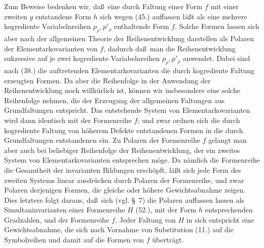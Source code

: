 Zum Beweise bedenken wir, da\ss\ eine durch Faltung einer Form $f$ mit einer zweiten $g$ entstandene Form $h$ sich wegen (45.) auffassen l\"a\ss t als eine mehrere kogrediente Variabelnreihen $p_\rho,p'_\rho$ enthaltende Form $f$. Solche Formen lassen sich aber nach der allgemeinen Theorie der Reihenentwicklung darstellen als Polaren der Elementarkovarianten von $f$, dadurch da\ss\ man die Reihenentwicklung sukzessive auf je zwei kogrediente Variabelnreihen $p_\rho,p'_\rho$ anwendet. Dabei sind nach (38.) die auftretenden Elementarkovarianten die durch kogrediente Faltung erzeugten Formen. Da aber die Reihenfolge in der Anwendung der Reihenentwicklung noch willk\"urlich ist, k\"onnen wir insbesondere eine solche Reihenfolge nehmen, die der Erzeugung der allgemeinen Faltungen aus Grundfaltungen entspricht. Das entstehende System von Elementarkovarianten wird dann identisch mit der Formenreihe $f$; und zwar ordnen sich die durch kogrediente Faltung von h\"oherem Defekte entstandenen Formen in die durch Grundfaltungen entstandenen ein. Zu Polaren der Formenreihe $f$ gelangt man aber auch bei beliebiger Reihenfolge der Reihenentwicklung, der ein zweites System von Elementarkovarianten entsprechen m\"oge. Da n\"amlich die Formenreihe die Gesamtheit der invarianten Bildungen ersch\"opft, l\"a\ss t sich jede Form des zweiten Systems linear ausdr\"ucken durch Polaren der Formenreihe, und zwar Polaren derjenigen Formen, die gleiche oder h\"ohere Gewichtsabnahme zeigen. Dies letztere folgt daraus, da\ss\ sich (vgl. \S\ 7) die Polaren auffassen lassen als Simultaninvarianten einer Formenreihe $H$ (52.), mit der Form $h$ entsprechenden Gradzahlen, und der Formenreihe $f$. Jeder Faltung von $H$ in sich entspricht eine Gewichtsabnahme, die sich nach Vornahme von Substitution (11.) auf die Symbolreihen und damit auf die Formen von $f$ \"ubertr\"agt.

